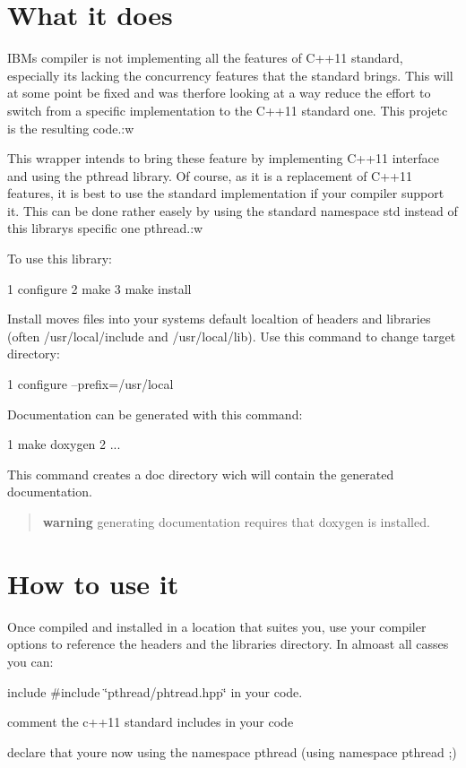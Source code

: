 \section*{What it does}

I\+BM\textquotesingle{}s compiler is not implementing all the features of C++11 standard, especially it\textquotesingle{}s lacking the concurrency features that the standard brings. This will at some point be fixed and was therfore looking at a way reduce the effort to switch from a specific implementation to the C++11 standard one. This projetc is the resulting code.\+:w

This wrapper intends to bring these feature by implementing C++11 interface and using the pthread library. Of course, as it is a replacement of C++11 features, it is best to use the standard implementation if your compiler support it. This can be done rather easely by using the standard namespace {\ttfamily std} instead of this library\textquotesingle{}s specific one {\ttfamily pthread}.\+:w

To use this library\+: 
\begin{DoxyCode}
1 configure
2 make
3 make install
\end{DoxyCode}


Install moves files into your system\textquotesingle{}s default localtion of headers and libraries (often /usr/local/include and /usr/local/lib). Use this command to change target directory\+: 
\begin{DoxyCode}
1 configure --prefix=/usr/local
\end{DoxyCode}


Documentation can be generated with this command\+: 
\begin{DoxyCode}
1 make doxygen
2 ...
\end{DoxyCode}


This command creates a {\ttfamily doc} directory wich will contain the generated documentation.

\begin{quote}
{\bfseries warning} generating documentation requires that doxygen is installed. \end{quote}


\section*{How to use it}

Once compiled and installed in a location that suites you, use your compiler options to reference the headers and the libraries directory. In almoast all casses you can\+:
\begin{DoxyItemize}
\item include {\ttfamily \#include \char`\"{}pthread/phtread.\+hpp\char`\"{}} in your code.
\item comment the c++11 standard includes in your code
\item declare that you\textquotesingle{}re now using the namespace pthread ({\ttfamily using namespace pthread ;})
\end{DoxyItemize}

